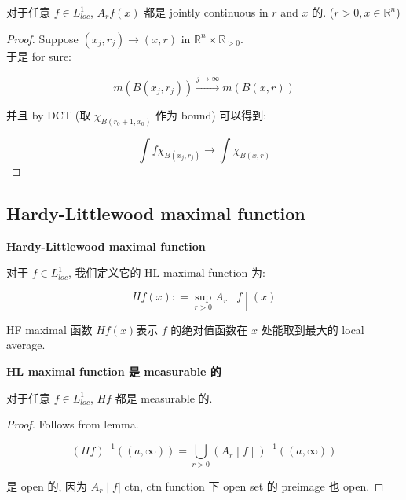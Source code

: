 \documentclass{qlnotes-export}
\begin{document}
\begin{lemma}

对于任意 \(f \in L_{loc}^{1}\), \(A_{r}f(x)\) 都是 jointly continuous in \(r\) and \(x\) 的. (\(r > 0,x \in {\mathbb{R}}^{n}\))

\end{lemma}

\begin{proof}

Suppose \((x_{j},r_{j})\rightarrow(x,r)\) in \({\mathbb{R}}^{n} \times {\mathbb{R}}_{> 0}\).\\
于是 for sure:

\[m(B(x_{j},r_{j}))\overset{j\rightarrow\infty}{\rightarrow}m(B(x,r))\]

并且 by DCT (取 \(\chi_{B(r_{0} + 1,x_{0})}\) 作为 bound) 可以得到:

\[\int f\chi_{B(x_{j},r_{j})}\rightarrow\int\chi_{B(x,r)}\]

\end{proof}

\subsection{Hardy-Littlewood maximal function}\label{hardy-littlewood-maximal-function}

\begin{definition}{\protect{}\label{kn-hardy-littlewood-maximal-function}{\textbf{Hardy-Littlewood
maximal function}}}

对于 \(f \in L_{loc}^{1}\), 我们定义它的 HL maximal function 为:

\[\left. Hf(x): = \sup\limits_{r > 0}A_{r} \middle| f \middle| (x) \right.\]

\end{definition}

HF maximal 函数 \(Hf(x)\)表示 \(f\) 的绝对值函数在 \(x\) 处能取到最大的 local average.

\begin{theorem}{\protect{}\label{kn-hl-maximal-function-measurable}{\textbf{HL
maximal function 是 measurable 的}}}

对于任意 \(f \in L_{loc}^{1}\), \(Hf\) 都是 measurable 的.

\end{theorem}

\begin{proof}

Follows from lemma.

\[\left. (Hf)^{- 1}((a,\infty)) = \bigcup\limits_{r > 0}(A_{r} \middle| f \middle| )^{- 1}((a,\infty)) \right.\]

是 open 的, 因为 \(\left. A_{r} \middle| f| \right.\) ctn, ctn function 下 open set 的 preimage 也 open.

\end{proof}
\end{document}
